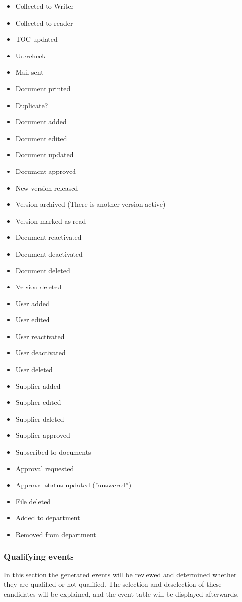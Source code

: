 \begin{itemize}
	\item Collected to Writer %
	\item Collected to reader %
	\item TOC updated
	\item Usercheck %
	\item Mail sent %
	\item Document printed
	\item Duplicate? %
	\item Document added
	\item Document edited
	\item Document updated
	\item Document approved
	\item New version released
	\item Version archived (There is another version active) %
	\item Version marked as read
	\item Document reactivated
	\item Document deactivated
	\item Document deleted
	\item Version deleted
	\item User added
	\item User edited
	\item User reactivated
	\item User deactivated
	\item User deleted
	\item Supplier added %
	\item Supplier edited %
	\item Supplier deleted %
	\item Supplier approved %
	\item Subscribed to documents
	\item Approval requested
	\item Approval status updated (''answered'')
	\item File deleted
        \item Added to department %
        \item Removed from department %
\end{itemize}

\subsubsection{Qualifying events}
In this section the generated events will be reviewed and determined whether they are qualified or not qualified.
The selection and deselection of these candidates will be explained, and the event table will be displayed afterwards.


